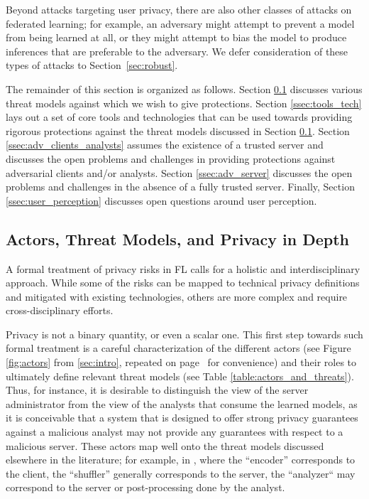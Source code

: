 Beyond attacks targeting user privacy, there are also other classes of attacks on federated learning; for example, an adversary might attempt to prevent a model from being learned at all, or they might attempt to bias the model to produce inferences that are preferable to the adversary.  We defer consideration of these types of attacks to Section~\ref{sec:robust}.

The remainder of this section is organized as follows. Section \ref{ssec:actors_threat_models} discusses various threat models against which we wish to give protections. Section \ref{ssec:tools_tech} lays out a set of core tools and technologies that can be used towards providing rigorous protections against the threat models discussed in Section \ref{ssec:actors_threat_models}. Section \ref{ssec:adv_clients_analysts} assumes the existence of a trusted server and discusses the open problems and challenges in providing protections against adversarial clients and/or analysts. Section \ref{ssec:adv_server} discusses the open problems and challenges in the absence of a fully trusted server. Finally, Section \ref{ssec:user_perception} discusses open questions around user perception. 

\subsection{Actors, Threat Models, and Privacy in Depth}
\label{ssec:actors_threat_models}

A formal treatment of privacy risks in FL calls for a holistic and interdisciplinary approach. While some of the risks can be mapped to technical privacy definitions and mitigated with existing technologies, others are more complex and require cross-disciplinary efforts. 

Privacy is not a binary quantity, or even a scalar one. This first step towards such formal treatment is a careful characterization of the different actors (see Figure \ref{fig:actors} from \cref{sec:intro}, repeated on page~\pageref{fig:actors_repeat} for convenience) and their roles to ultimately define relevant threat models (see Table \ref{table:actors_and_threats}). Thus, for instance, it is desirable to distinguish the view of the server administrator from the view of the analysts that consume the learned models, as it is conceivable that a system that is designed to offer strong privacy guarantees against a malicious analyst may not provide any guarantees with respect to a malicious server. These actors map well onto the threat models discussed elsewhere in the literature; for example, in \citet[Sec 3.1]{prochlo}, where the ``encoder'' corresponds to the client, the ``shuffler'' generally corresponds to the server, the ``analyzer`` may correspond to the server or post-processing done by the analyst.

